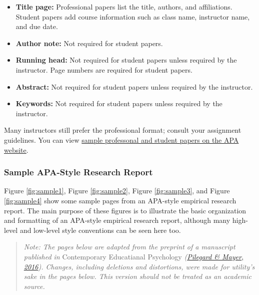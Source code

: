\documentclass[
]{krantz}
\providecommand{\tightlist}{%
  \setlength{\itemsep}{0pt}\setlength{\parskip}{0pt}}
\begin{document}
\begin{itemize}
\tightlist
\item
  \textbf{Title page:} Professional papers list the title, authors, and affiliations. Student papers add course information such as class name, instructor name, and due date.
\item
  \textbf{Author note:} Not required for student papers.
\item
  \textbf{Running head:} Not required for student papers unless required by the instructor. Page numbers are required for student papers.
\item
  \textbf{Abstract:} Not required for student papers unless required by the instructor.
\item
  \textbf{Keywords:} Not required for student papers unless required by the instructor.
\end{itemize}

Many instructors still prefer the professional format; consult your assignment guidelines. You can view \href{https://apastyle.apa.org/style-grammar-guidelines/paper-format/sample-papers}{sample professonal and student papers on the APA website}.

\hypertarget{sample-apa-style-research-report}{%
\subsubsection*{Sample APA-Style Research Report}\label{sample-apa-style-research-report}}


Figure \ref{fig:sample1}, Figure \ref{fig:sample2}, Figure \ref{fig:sample3}, and Figure \ref{fig:sample4} show some sample pages from an APA-style empirical research report. The main purpose of these figures is to illustrate the basic organization and formatting of an APA-style empirical research report, although many high-level and low-level style conventions can be seen here too.

\begin{quote}
\emph{Note: The pages below are adapted from the preprint of a manuscript published in} Contemporary Educatianal Psychology \emph{(\protect\hyperlink{ref-pilegard2016improving}{Pilegard \& Mayer, 2016}). Changes, including deletions and distortions, were made for utility's sake in the pages below. This version should not be treated as an academic source.}
\end{quote}
\end{document}
